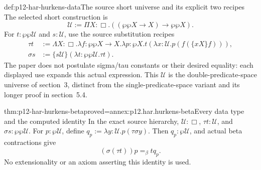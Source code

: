 \begin{hbdefinition}{def:p12-har-hurkens-data}{The source short universe and its explicit two recipes}
The selected short construction is
\[
 \mathcal U:=\Pi X:\Box.
       ((\wp\wp X\to X)\to\wp\wp X).
\]
For \(t:\wp\wp\mathcal U\) and \(s:\mathcal U\), use the
source substitution recipes
\[
\begin{aligned}
 \tau t&:=\Lambda X:\Box.\lambda f:\wp\wp X\to X.
      \lambda p:\wp X.
      t(\lambda x:\mathcal U.p(f(\{xX\}f))),\\
 \sigma s&:=\{s\mathcal U\}
      (\lambda t:\wp\wp\mathcal U.\tau t).
\end{aligned}
\]
The paper does not postulate sigma/tau constants or their desired equality:
each displayed use expands this actual expression. This \(\mathcal U\)
is the double-predicate-space universe of section~3, distinct from the
single-predicate-space variant and its longer proof in section~5.4.
\end{hbdefinition}

\begin{hblemma}{thm:p12-har-hurkens-beta}{proved=annex:p12.har.hurkens-beta}{Every data type and the computed identity}
In the exact source hierarchy,
\(\mathcal U:\Box\), \(\tau t:\mathcal U\), and
\(\sigma s:\wp\wp\mathcal U\). For \(p:\wp\mathcal U\),
define \(q_p:=\lambda y:\mathcal U.p(\tau\sigma y)\).
Then \(q_p:\wp\mathcal U\), and actual beta contractions give
\[
 (\sigma(\tau t))p=_\beta t q_p.
\]
No extensionality or an axiom asserting this identity is used.
\end{hblemma}

